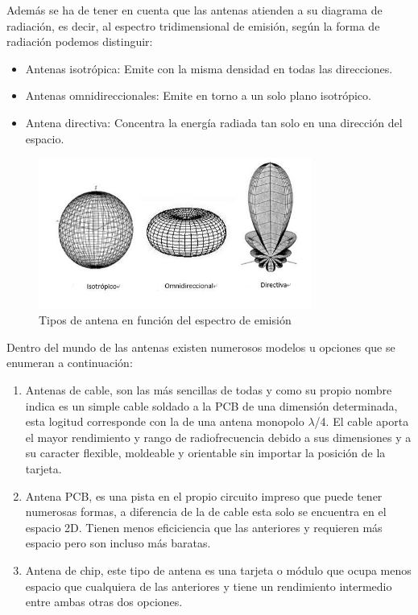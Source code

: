 \documentclass[a4paper ,12pt, onecolumn]{article}
\begin{document}
            Además se ha de tener en cuenta que las antenas atienden a su diagrama de radiación, es decir, al
            espectro tridimensional de emisión, según la forma de radiación podemos distinguir:
            \begin{itemize}
                \item  Antenas isotrópica: Emite con la misma densidad en todas las direcciones.
                \item  Antenas omnidireccionales: Emite en torno a un solo plano isotrópico.
                \item  Antena directiva: Concentra la energía radiada tan solo en una dirección del espacio.
            \end{itemize}
            \begin{center}
                \begin{figure}[h]
                    \centering
                    \includegraphics[width=0.8\textwidth]{antenna_types.PNG}
                    \caption{Tipos de antena en función del espectro de emisión}
                    \label{fig:mesh10}
                \end{figure}
            \end{center}
            Dentro del mundo de las antenas existen numerosos modelos u opciones que se enumeran a continuación:
            \begin{enumerate}
                \item Antenas de cable, son las más sencillas de todas y como su propio nombre indica es un simple cable soldado a la PCB de una dimensión determinada, esta logitud corresponde con la de una antena monopolo $\lambda$/4. El cable aporta el mayor rendimiento y rango de radiofrecuencia debido a sus dimensiones y a su caracter flexible, moldeable y orientable sin importar  la posición de la tarjeta.
                \item Antena PCB, es una pista en el propio circuito impreso que puede tener numerosas formas, a diferencia de la de cable esta solo se encuentra en el espacio 2D. Tienen menos eficiciencia que las anteriores y requieren más espacio pero son incluso más baratas.
                \item Antena de chip, este tipo de antena es una tarjeta o módulo que ocupa menos espacio que cualquiera de las anteriores y tiene un rendimiento intermedio entre ambas otras dos opciones.
            \end{enumerate}
\end{document}
